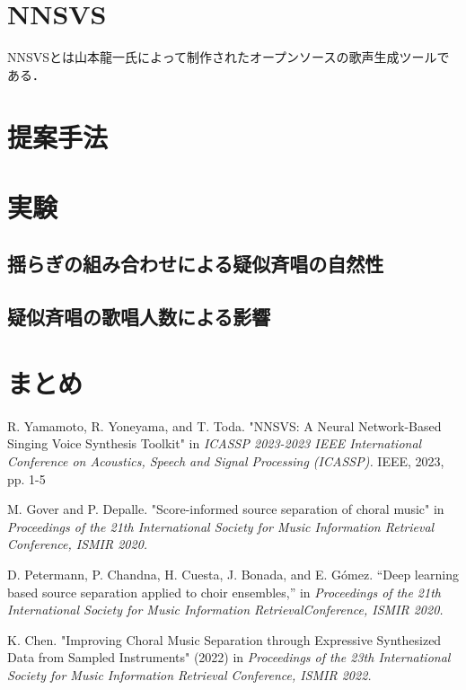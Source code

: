 \documentclass[submit]{ipsj}
\begin{document}
\section{NNSVS}
\label{sec:nnsvs}
NNSVSとは山本龍一氏によって制作されたオープンソースの歌声生成ツールである．\cite{yamamoto2022nnsvs}


\section{提案手法}
\label{methods}


\section{実験}
\label{sec:experiment}
\subsection{揺らぎの組み合わせによる疑似斉唱の自然性}

\subsection{疑似斉唱の歌唱人数による影響}
\section{まとめ}

\begin{acknowledgment}

\end{acknowledgment}

\begin{thebibliography}{9}
R. Yamamoto, R. Yoneyama, and T. Toda.
"NNSVS: A Neural Network-Based Singing Voice Synthesis Toolkit"
in {\it ICASSP 2023-2023 IEEE International Conference on Acoustics, Speech and Signal Processing (ICASSP).}
IEEE, 2023, pp. 1-5

M. Gover and P. Depalle. "Score-informed source separation of choral music"
in {\it Proceedings of the 21th International Society for Music Information Retrieval
Conference, ISMIR 2020.}

D. Petermann, P. Chandna, H. Cuesta, J. Bonada, and E. Gómez.
“Deep learning based source separation applied to choir ensembles,” in
{\it Proceedings of the 21th International Society for Music Information RetrievalConference, ISMIR 2020.}

K. Chen.
"Improving Choral Music Separation through Expressive Synthesized Data from Sampled Instruments" (2022)
in {\it Proceedings of the 23th
International Society for Music Information Retrieval
Conference, ISMIR 2022.}

\end{thebibliography}
\end{document}
